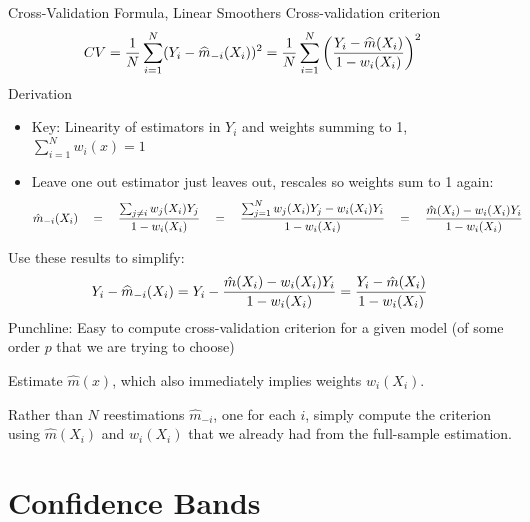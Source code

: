 \documentclass[aspectratio=169, handout]{beamer}
\newcommand{\sumiN}{\sum^N_{i=1}}
\begin{document}
{\scriptsize
\begin{frame}{Cross-Validation Formula, Linear Smoothers}
Cross-validation criterion
\begin{align*}
  CV
  &=
  \frac{1}{N}
  \sumiN
  (Y_i-\widehat{m}_{-i}(X_i))^2
  =
  \frac{1}{N}
  \sumiN
  \left(
    \frac{%
      Y_i-\widehat{m}(X_i)
    }{%
      1-w_i(X_i)
    }
  \right)^2
\end{align*}
\pause
Derivation
\begin{itemize}
  \item \alert{Key}:
    Linearity of estimators in $Y_i$ and weights summing to 1,
    $\sumiN w_i(x)=1$
  \pause
  \item Leave one out estimator just leaves out, rescales so
    weights sum to 1 again:
    \begin{align*}
      \hat{m}_{-i}(X_i)
      \quad
      &=
      \quad
      \frac{%
        \sum_{j\neq i}w_j(X_i)Y_j
      }{%
        1-w_i(X_i)
      }
      \quad
      =
      \quad
      \frac{%
        \sum_{j=1}^N w_j(X_i)Y_j
        -w_i(X_i)Y_i
      }{%
        1-w_i(X_i)
      }
      \quad
      =
      \quad
      \frac{%
        \hat{m}(X_i)-w_i(X_i)Y_i
      }{%
        1-w_i(X_i)
      }
    \end{align*}
\end{itemize}
\pause
Use these results to simplify:
\begin{align*}
  Y_i-\widehat{m}_{-i}(X_i)
  =
  Y_i-
  \frac{%
    \hat{m}(X_i)-w_i(X_i)Y_i
  }{%
    1-w_i(X_i)
  }
  =
  \frac{%
    Y_i - \hat{m}(X_i)
  }{%
    1-w_i(X_i)
  }
\end{align*}
\pause
\alert{Punchline}:
Easy to compute cross-validation criterion
for a given model (of some order $p$ that we are trying to choose)
\vspace{-7pt}
\begin{itemize}
  {\scriptsize
  \item Estimate $\hat{m}(x)$, which also immediately implies
    weights $w_i(X_i)$.

  \pause
  \item Rather than $N$ reestimations $\widehat{m}_{-i}$, one for
    each $i$, simply compute  the criterion using $\widehat{m}(X_i)$
    and $w_i(X_i)$ that we already had from the full-sample estimation.
  }
\end{itemize}
\end{frame}
}






\section{Confidence Bands}
\end{document}
